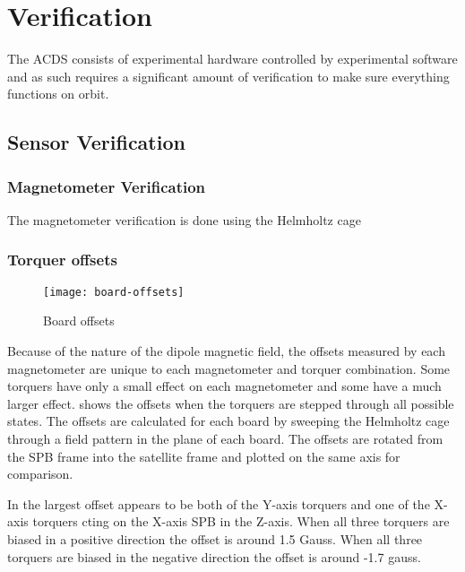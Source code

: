 
\chapter{Verification}

\label{ch:Verification}

The \ac{ACDS} consists of experimental hardware controlled by experimental software and as such requires a significant amount of verification to make sure everything functions on orbit.

\section{Sensor Verification}

\subsection{Magnetometer Verification}

The magnetometer verification is done using the Helmholtz cage


\subsection{Torquer offsets}

\begin{figure}[!ht]
    \centering
    \texttt{[image: board-offsets]}
    \caption{Board offsets}
    \label{fig:b-offset}
\end{figure}

Because of the nature of the dipole magnetic field, the offsets measured by each magnetometer are unique to each magnetometer and torquer combination. Some torquers have only a small effect on each magnetometer and some have a much larger effect.  shows the offsets when the torquers are stepped through all possible states. The offsets are calculated for each board by sweeping the Helmholtz cage through a field pattern in the plane of each board. The offsets are rotated from the \ac{SPB} frame into the satellite frame and plotted on the same axis for comparison.

In  the largest offset appears to be both of the Y-axis torquers and one of the X-axis torquers cting on the X-axis \ac{SPB} in the Z-axis. When all three torquers are biased in a positive direction the offset is around 1.5 Gauss. When all three torquers are biased in the negative direction the offset is around -1.7 gauss.


